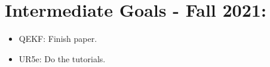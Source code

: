 \documentclass[11pt]{article}
\begin{document}
\section{Intermediate Goals - Fall 2021:}
\begin{itemize}
      \item QEKF: Finish paper.
      \item UR5e: Do the tutorials.
\end{itemize}

\newpage

% 
% 
\end{document}
